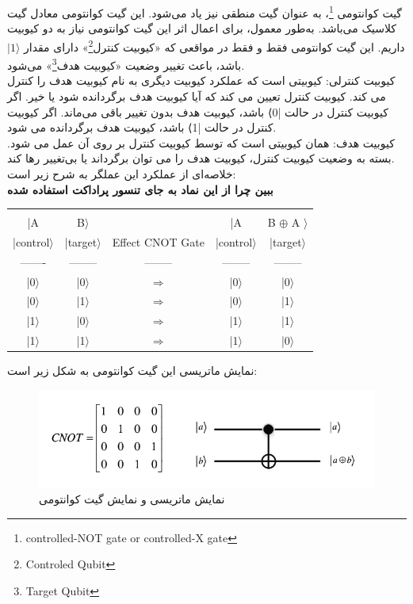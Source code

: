 \documentclass{book}
\begin{document}
گیت کوانتومی \footnote{ controlled-NOT gate or controlled-X gate}، به عنوان گیت منطقی نیز یاد می‌شود. این گیت کوانتومی معادل گیت  کلاسیک می‌باشد.
به‌طور معمول، برای اعمال اثر این گیت کوانتومی نیاز به دو کیوبیت داریم. این گیت کوانتومی فقط و فقط در مواقعی که «کیوبیت کنترل\footnote{Controled Qubit}» دارای مقدار $\vert 1 \rangle$ باشد، باعث تغییر وضعیت «کیوبیت هدف\footnote{Target Qubit}» می‌شود.\\

کیوبیت کنترلی: کیوبیتی است که عملکرد کیوبیت دیگری به نام کیوبیت هدف را کنترل می کند. کیوبیت کنترل تعیین می کند که آیا کیوبیت هدف برگردانده شود یا خیر. اگر کیوبیت کنترل در حالت |0⟩ باشد، کیوبیت هدف بدون تغییر باقی می‌ماند. اگر کیوبیت کنترل در حالت |1⟩ باشد، کیوبیت هدف برگردانده می شود.\\

کیوبیت هدف: همان کیوبیتی است که توسط کیوبیت کنترل بر روی آن عمل می شود. بسته به وضعیت کیوبیت کنترل، کیوبیت هدف را می توان برگرداند یا بی‌تغییر رها کند.\\



خلاصه‌ای از عملکرد این عملگر به شرح زیر است:\\
\textbf{ببین چرا از این نماد به جای تنسور پراداکت استفاده شده}
\begin{latin}
\begin{tabular}{ccccc}
	&&&&\\
	|A & B$\rangle$ &	&  |A &B $\oplus$ A $\rangle$  \\
	|control$\rangle$ & |target$\rangle$ & Effect CNOT Gate &|control$\rangle$ & |target$\rangle$ \\
	------- & -------- & -------- & -------- & --------  \\
	|0$\rangle$ & |0$\rangle$ & $\Longrightarrow$ &|0$\rangle$ & |0$\rangle$ \\
	|0$\rangle$ & |1$\rangle$ & $\Longrightarrow$ &|0$\rangle$ & |1$\rangle$ \\
	|1$\rangle$ & |0$\rangle$ & $\Longrightarrow$ &|1$\rangle$ & |1$\rangle$ \\
	|1$\rangle$ & |1$\rangle$ & $\Longrightarrow$ &|1$\rangle$ & |0$\rangle$
\end{tabular}
\end{latin}


نمایش ماتریسی این گیت کوانتومی به شکل زیر است:
\begin{figure}[ht]
	\centering
	\includegraphics[width=\linewidth]{Matrix-representation-and-quantum-circuit-of-CNOT-gate.png}
	\caption{نمایش ماتریسی و نمایش گیت کوانتومی }
	\label{CNOT}
\end{figure}
\end{document}
